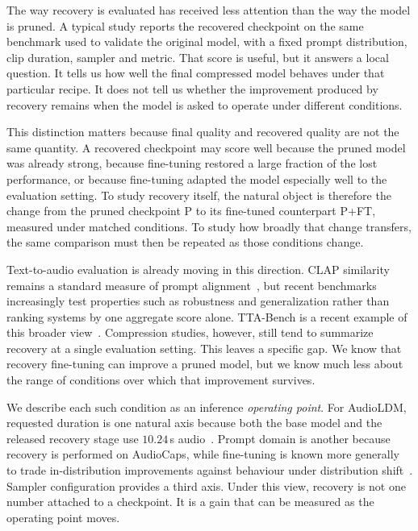 \documentclass{article}
\newcommand{\PFT}{P{+}FT}
\begin{document}
The way recovery is evaluated has received less attention than the way the model is pruned. A typical study reports the recovered checkpoint on the same benchmark used to validate the original model, with a fixed prompt distribution, clip duration, sampler and metric. That score is useful, but it answers a local question. It tells us how well the final compressed model behaves under that particular recipe. It does not tell us whether the improvement produced by recovery remains when the model is asked to operate under different conditions.

This distinction matters because final quality and recovered quality are not the same quantity. A recovered checkpoint may score well because the pruned model was already strong, because fine-tuning restored a large fraction of the lost performance, or because fine-tuning adapted the model especially well to the evaluation setting. To study recovery itself, the natural object is therefore the change from the pruned checkpoint P to its fine-tuned counterpart \PFT{}, measured under matched conditions. To study how broadly that change transfers, the same comparison must then be repeated as those conditions change.

Text-to-audio evaluation is already moving in this direction. CLAP similarity remains a standard measure of prompt alignment~\cite{wu2023clap,huang2023makeanaudio,ghosal2023tango}, but recent benchmarks increasingly test properties such as robustness and generalization rather than ranking systems by one aggregate score alone. TTA-Bench is a recent example of this broader view~\cite{wang2026ttabench}. Compression studies, however, still tend to summarize recovery at a single evaluation setting. This leaves a specific gap. We know that recovery fine-tuning can improve a pruned model, but we know much less about the range of conditions over which that improvement survives.

We describe each such condition as an inference \emph{operating point}. For AudioLDM, requested duration is one natural axis because both the base model and the released recovery stage use $10.24$\,s audio~\cite{liu2023audioldm,liu2024audioldm2}. Prompt domain is another because recovery is performed on AudioCaps, while fine-tuning is known more generally to trade in-distribution improvements against behaviour under distribution shift~\cite{kumar2022finetuning}. Sampler configuration provides a third axis. Under this view, recovery is not one number attached to a checkpoint. It is a gain that can be measured as the operating point moves.
\end{document}
